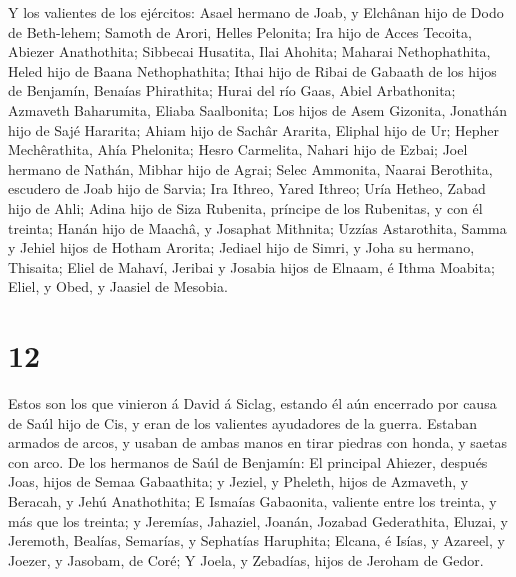  Y los valientes de los ejércitos: Asael hermano de Joab, y
Elchânan hijo de Dodo de Beth-lehem;  Samoth de Arori,
Helles Pelonita;  Ira hijo de Acces Tecoita, Abiezer
Anathothita;  Sibbecai Husatita, Ilai Ahohita;
 Maharai Nethophathita, Heled hijo de Baana Nethophathita;
 Ithai hijo de Ribai de Gabaath de los hijos de Benjamín,
Benaías Phirathita;  Hurai del río Gaas, Abiel Arbathonita;
 Azmaveth Baharumita, Eliaba Saalbonita;  Los
hijos de Asem Gizonita, Jonathán hijo de Sajé Hararita; 
Ahiam hijo de Sachâr Ararita, Eliphal hijo de Ur;  Hepher
Mechêrathita, Ahía Phelonita;  Hesro Carmelita, Nahari hijo
de Ezbai;  Joel hermano de Nathán, Mibhar hijo de Agrai;
 Selec Ammonita, Naarai Berothita, escudero de Joab hijo de
Sarvia;  Ira Ithreo, Yared Ithreo;  Uría
Hetheo, Zabad hijo de Ahli;  Adina hijo de Siza Rubenita,
príncipe de los Rubenitas, y con él treinta;  Hanán hijo de
Maachâ, y Josaphat Mithnita;  Uzzías Astarothita, Samma y
Jehiel hijos de Hotham Arorita;  Jediael hijo de Simri, y
Joha su hermano, Thisaita;  Eliel de Mahaví, Jeribai y
Josabia hijos de Elnaam, é Ithma Moabita;  Eliel, y Obed, y
Jaasiel de Mesobia.

\hypertarget{section-11}{%
\section{12}\label{section-11}}

 Estos son los que vinieron á David á Siclag, estando él aún
encerrado por causa de Saúl hijo de Cis, y eran de los valientes
ayudadores de la guerra.  Estaban armados de arcos, y usaban
de ambas manos en tirar piedras con honda, y saetas con arco. De los
hermanos de Saúl de Benjamín:  El principal Ahiezer, después
Joas, hijos de Semaa Gabaathita; y Jeziel, y Pheleth, hijos de Azmaveth,
y Beracah, y Jehú Anathothita;  E Ismaías Gabaonita,
valiente entre los treinta, y más que los treinta; y Jeremías, Jahaziel,
Joanán, Jozabad Gederathita,  Eluzai, y Jeremoth, Bealías,
Semarías, y Sephatías Haruphita;  Elcana, é Isías, y
Azareel, y Joezer, y Jasobam, de Coré;  Y Joela, y Zebadías,
hijos de Jeroham de Gedor.

